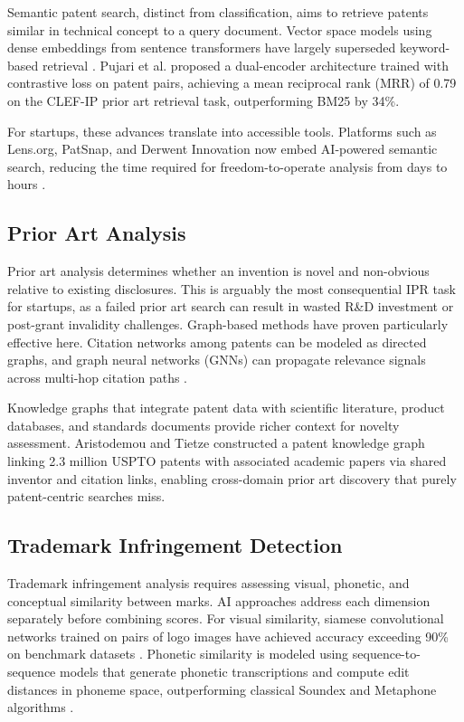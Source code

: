 \documentclass[conference]{IEEEtran}
\begin{document}
Semantic patent search, distinct from classification, aims to retrieve patents similar in technical concept to a query document. Vector space models using dense embeddings from sentence transformers have largely superseded keyword-based retrieval \cite{ref23}. Pujari et al. \cite{ref24} proposed a dual-encoder architecture trained with contrastive loss on patent pairs, achieving a mean reciprocal rank (MRR) of 0.79 on the CLEF-IP prior art retrieval task, outperforming BM25 by 34\%.

For startups, these advances translate into accessible tools. Platforms such as Lens.org, PatSnap, and Derwent Innovation now embed AI-powered semantic search, reducing the time required for freedom-to-operate analysis from days to hours \cite{ref25}.

\subsection{Prior Art Analysis}

Prior art analysis determines whether an invention is novel and non-obvious relative to existing disclosures. This is arguably the most consequential IPR task for startups, as a failed prior art search can result in wasted R\&D investment or post-grant invalidity challenges. Graph-based methods have proven particularly effective here. Citation networks among patents can be modeled as directed graphs, and graph neural networks (GNNs) can propagate relevance signals across multi-hop citation paths \cite{ref8}.

Knowledge graphs that integrate patent data with scientific literature, product databases, and standards documents provide richer context for novelty assessment. Aristodemou and Tietze \cite{ref26} constructed a patent knowledge graph linking 2.3 million USPTO patents with associated academic papers via shared inventor and citation links, enabling cross-domain prior art discovery that purely patent-centric searches miss.

\subsection{Trademark Infringement Detection}

Trademark infringement analysis requires assessing visual, phonetic, and conceptual similarity between marks. AI approaches address each dimension separately before combining scores. For visual similarity, siamese convolutional networks trained on pairs of logo images have achieved accuracy exceeding 90\% on benchmark datasets \cite{ref27}. Phonetic similarity is modeled using sequence-to-sequence models that generate phonetic transcriptions and compute edit distances in phoneme space, outperforming classical Soundex and Metaphone algorithms \cite{ref28}.
\end{document}
